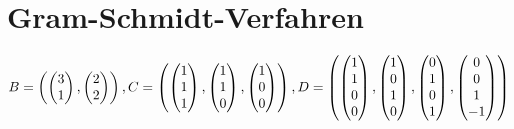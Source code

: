 \documentclass[ngerman,a4paper]{article}
\begin{document}
\section{Gram-Schmidt-Verfahren}
\begin{align}
	B = \left(\begin{pmatrix}3\\1\end{pmatrix}, \begin{pmatrix}2\\2\end{pmatrix}\right),
	C = \left(\begin{pmatrix}1\\1\\1\end{pmatrix}, \begin{pmatrix}1\\1\\0\end{pmatrix}, \begin{pmatrix}1\\0\\0\end{pmatrix}\right),
	D = \left(\begin{pmatrix}1\\1\\0\\0\end{pmatrix}, \begin{pmatrix}1\\0\\1\\0\end{pmatrix}, \begin{pmatrix}0\\1\\0\\1\end{pmatrix}, \begin{pmatrix}0\\0\\1\\-1\end{pmatrix}\right)\notag
\end{align}
\end{document}
